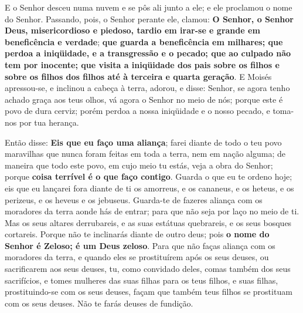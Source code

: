 E o Senhor desceu numa nuvem e se pôs ali junto a ele; e ele
proclamou o nome do Senhor. Passando, pois, o Senhor perante
ele, clamou: \textbf{O Senhor, o Senhor Deus, misericordioso e
piedoso, tardio em irar-se e grande em beneficência e verdade};
\textbf{que guarda a beneficência em milhares; que perdoa a
iniqüidade, e a transgressão e o pecado; que ao culpado não tem por
inocente; que visita a iniqüidade dos pais sobre os filhos e sobre
os filhos dos filhos até à terceira e quarta geração}. E Moisés
apressou-se, e inclinou a cabeça à terra, adorou, e disse:
Senhor, se agora tenho achado graça aos teus olhos, vá agora o
Senhor no meio de nós; porque este é povo de dura cerviz; porém
perdoa a nossa iniqüidade e o nosso pecado, e toma-nos por tua
herança.

Então disse: \textbf{Eis que eu faço uma aliança}; farei diante
de todo o teu povo maravilhas que nunca foram feitas em toda a
terra, nem em nação alguma; de maneira que todo este povo, em cujo
meio tu estás, veja a obra do Senhor; porque \textbf{coisa terrível
é o que faço contigo}. Guarda o que eu te ordeno hoje; eis
que eu lançarei fora diante de ti os amorreus, e os cananeus, e os
heteus, e os perizeus, e os heveus e os jebuseus. Guarda-te
de fazeres aliança com os moradores da terra aonde hás de entrar;
para que não seja por laço no meio de ti. Mas os seus altares
derrubareis, e as suas estátuas quebrareis, e os seus bosques
cortareis. Porque não te inclinarás diante de outro deus;
pois \textbf{o nome do Senhor é Zeloso; é um Deus zeloso}.
Para que não faças aliança com os moradores da terra, e
quando eles se prostituírem após os seus deuses, ou sacrificarem aos
seus deuses, tu, como convidado deles, comas também dos seus
sacrifícios, e tomes mulheres das suas filhas para os teus
filhos, e suas filhas, prostituindo-se com os seus deuses, façam que
também teus filhos se prostituam com os seus deuses. Não te
farás deuses de fundição.

